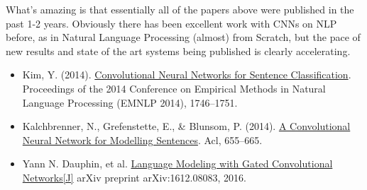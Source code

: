 \documentclass[UTF8,10pt,a4paper]{ctexbook}
\begin{document}
What's amazing is that essentially all of the papers above were published in the past 1-2 years. Obviously there has been excellent work with CNNs on NLP before, as in Natural Language Processing (almost) from Scratch, but the pace of new results and state of the art systems being published is clearly accelerating.

\begin{itemize}
\item Kim, Y. (2014). \href{http://arxiv.org/pdf/1408.5882}{Convolutional Neural Networks for Sentence Classification}. Proceedings of the 2014 Conference on Empirical Methods in Natural Language Processing (EMNLP 2014), 1746–1751.
\item Kalchbrenner, N., Grefenstette, E., \& Blunsom, P. (2014). \href{http://arxiv.org/pdf/1404.2188.pdf}{A Convolutional Neural Network for Modelling Sentences}. Acl, 655–665.
\item Yann N. Dauphin, et al. \href{https://arxiv.org/pdf/1612.08083v1.pdf}{Language Modeling with Gated Convolutional Networks[J]} arXiv preprint arXiv:1612.08083, 2016.
\end{itemize}
\end{document}
